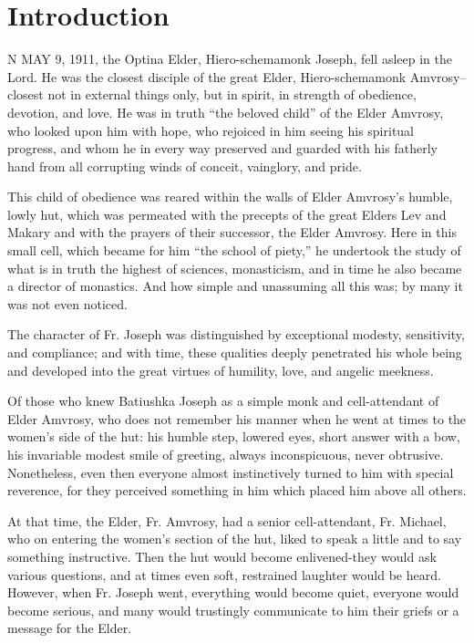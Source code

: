 \chapter*{Introduction}

N MAY 9, 1911, the Optina Elder, Hiero-schemamonk Joseph, fell asleep in the Lord. \label{intro-excerpt} He was the closest disciple of the great Elder, Hiero-schemamonk Amvrosy--closest not in external things only, but in spirit, in strength of obedience, devotion, and love. He was in truth ``the beloved child'' of the Elder Amvrosy, who looked upon him with hope, who rejoiced in him seeing his spiritual progress, and whom he in every way preserved and guarded with his fatherly hand from all corrupting winds of conceit, vainglory, and pride.

This child of obedience was reared within the walls of Elder Amvrosy's humble, lowly hut, which was permeated with the precepts of the great Elders Lev and Makary and with the prayers of their successor, the Elder Amvrosy. Here in this small cell, which became for him ``the school of piety,'' he undertook the study of what is in truth the highest of sciences, monasticism, and in time he also became a director of monastics. And how simple and unassuming all this was; by many it was not even noticed.

The character of Fr. Joseph was distinguished by exceptional modesty, sensitivity, and compliance; and with time, these qualities deeply penetrated his whole being and developed into the great virtues of humility, love, and angelic meekness.

Of those who knew Batiushka Joseph as a simple monk and cell-attendant of Elder Amvrosy, who does not remember his manner when he went at times to the women's side of the hut: his humble step, lowered eyes, short answer with a bow, his invariable modest smile of greeting, always inconspicuous, never obtrusive. Nonetheless, even then everyone almost instinctively turned to him with special reverence, for they perceived something in him which placed him above all others.

At that time, the Elder, Fr. Amvrosy, had a senior cell-attendant, Fr. Michael, who on entering the women's section of the hut, liked to speak a little and to say something instructive. Then the hut would become enlivened-they would ask various questions, and at times even soft, restrained laughter would be heard. However, when Fr. Joseph went, everything would become quiet, everyone would become serious, and many would trustingly communicate to him their griefs or a message for the Elder.
